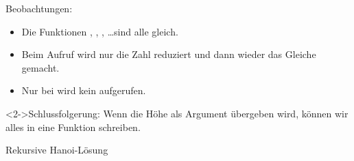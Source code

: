 \begin{fframe}
\begin{block}{Beobachtungen:}
	\begin{itemize}
		\item Die Funktionen , , , \ldots sind alle gleich.
		\item Beim Aufruf wird nur die Zahl reduziert und dann wieder das Gleiche gemacht.
		\item Nur bei  wird kein  aufgerufen.
	\end{itemize}
\end{block}
\begin{block}<2->{Schlussfolgerung: Wenn die Höhe als Argument übergeben wird, können wir alles in eine Funktion schreiben.}
\end{block}
\end{fframe}

\begin{fframe}
\begin{block}{Rekursive Hanoi-Lösung}
\end{block}
\end{fframe}
